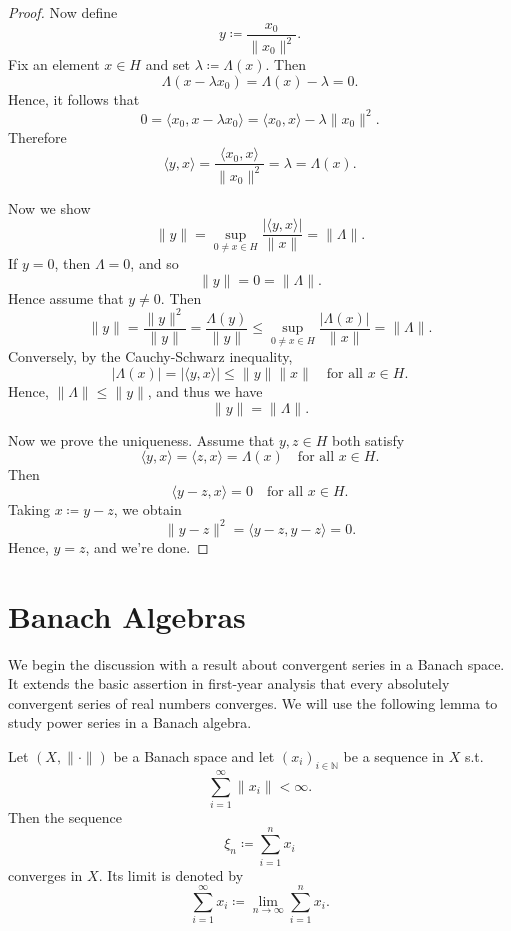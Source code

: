 \begin{proof}
    Now define 
    \[
        y \coloneqq \frac{x_0}{\lVert x_0 \rVert^2 }.
    \]
    Fix an element \(x \in H\) and set \(\lambda \coloneqq \Lambda (x)\). Then 
    \[
        \Lambda (x - \lambda x_0) = \Lambda (x) - \lambda = 0.
    \]  
    Hence, it follows that 
    \[
        0 = \langle x_0, x - \lambda x_0 \rangle = \langle x_0, x \rangle - \lambda \lVert x_0 \rVert^2.   
    \]
    Therefore
    \[
        \langle y, x \rangle = \frac{\langle x_0, x \rangle }{\lVert x_0 \rVert^2 } = \lambda = \Lambda (x). 
    \]

    Now we show 
    \[
        \lVert y \rVert = \sup _{0 \neq x \in H} \frac{\vert \langle y, x \rangle  \vert }{\lVert x \rVert } = \lVert \Lambda  \rVert.  
    \]
    If \(y = 0\), then \(\Lambda = 0\), and so
    \[
        \lVert y \rVert = 0 = \lVert \Lambda \rVert.  
    \]   
    Hence assume that \(y \neq 0\). Then 
    \[
        \lVert y \rVert = \frac{\lVert y \rVert^2 }{\lVert y \rVert } = \frac{\Lambda (y)}{\lVert y \rVert } \le \sup _{0 \neq x \in H} \frac{\vert \Lambda (x) \vert }{\lVert x \rVert } = \lVert \Lambda \rVert.
    \] 
    Conversely, by the Cauchy-Schwarz inequality, 
    \[
        \vert \Lambda (x) \vert = \vert \langle y, x \rangle  \vert \le \lVert y \rVert \lVert x \rVert \quad \text{for all } x \in H. 
    \]
    Hence, \(\lVert \Lambda  \rVert \le \lVert y \rVert  \), and thus we have 
    \[
        \lVert y \rVert = \lVert \Lambda \rVert.  
    \] 

    Now we prove the uniqueness. Assume that \(y, z \in H\) both satisfy 
    \[
        \langle y, x \rangle = \langle z, x \rangle = \Lambda (x) \quad \text{for all } x \in H.   
    \] 
    Then
    \[
        \langle y - z, x \rangle = 0 \quad \text{for all } x \in H.  
    \]
    Taking \(x \coloneqq y - z\), we obtain 
    \[
        \lVert y - z \rVert^2 = \langle y - z, y - z \rangle = 0.  
    \] 
    Hence, \(y = z\), and we're done. 
\end{proof}

\section{Banach Algebras}
We begin the discussion with a result about convergent series in a Banach space. It extends the basic assertion in first-year analysis that every absolutely convergent series of real numbers converges. We will use the following lemma to study power series in a Banach algebra. 

\begin{lemma} \label{lm: convergent series}
    Let \((X, \lVert \cdot \rVert )\) be a Banach space and let \((x_i)_{i \in \mathbb{N} }\) be a sequence in \(X\) s.t. 
    \[
        \sum_{i=1}^{\infty} \lVert x_i \rVert < \infty.  
    \]   
    Then the sequence 
    \[
        \xi_n \coloneqq \sum_{i=1}^n x_i 
    \]
    converges in \(X\). Its limit is denoted by 
    \[
        \sum_{i=1}^{\infty} x_i \coloneqq \lim_{n \to \infty} \sum_{i=1}^n x_i.   
    \] 
\end{lemma}

